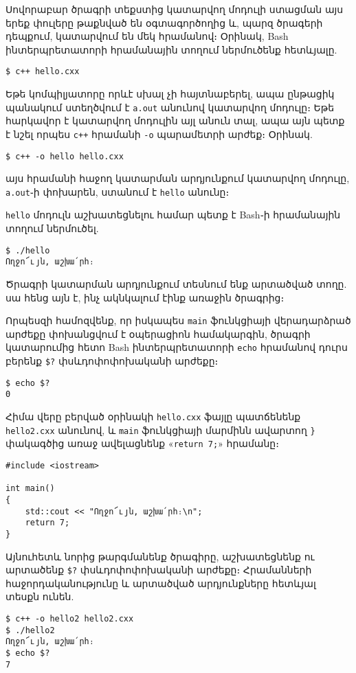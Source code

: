 Սովորաբար ծրագրի տեքստից կատարվող մոդուլի ստացման այս երեք փուլերը 
թաքնված են օգտագործողից և, պարզ ծրագերի դեպքում, կատարվում են մեկ 
հրամանով։ Օրինակ, Bash ինտերպրետատորի հրամանային տողում ներմուծենք 
հետևյալը.

\begin{Verbatim}
$ c++ hello.cxx
\end{Verbatim}

Եթե կոմպիլյատորը որևէ սխալ չի հայտնաբերել, ապա ընթացիկ պանակում ստեղծվում 
է \texttt{a.out} անունով կատարվող մոդուլը։ Եթե հարկավոր է կատարվող մոդուլին 
այլ անուն տալ, ապա այն պետք է նշել որպես \texttt{c++} հրամանի \texttt{-o} 
պարամետրի արժեք։ Օրինակ.

\begin{Verbatim}
$ c++ -o hello hello.cxx
\end{Verbatim}

\noindent այս հրամանի հաջող կատարման արդյունքում կատարվող մոդուլը, 
\texttt{a.out}֊ի փոխարեն, ստանում է \texttt{hello} անունը։

\texttt{hello} մոդուլն աշխատեցնելու համար պետք է Bash֊ի հրամանային 
տողում ներմուծել.

\begin{Verbatim}
$ ./hello
Ողջո՜ւյն, աշխա՛րհ։
\end{Verbatim}

Ծրագրի կատարման արդյունքում տեսնում ենք արտածված տողը. սա հենց այն է, 
ինչ ակնկալում էինք առաջին ծրագրից։

Որպեսզի համոզվենք, որ իսկապես \texttt{main} ֆունկցիայի վերադարձրած արժեքը 
փոխանցվում է օպերացիոն համակարգին, ծրագրի կատարումից հետո Bash ինտերպրետատորի 
\texttt{echo} հրամանով դուրս բերենք \verb|$?| փսևդոփոփոխականի արժեքը։

\begin{Verbatim}
$ echo $?
0
\end{Verbatim}

Հիմա վերը բերված օրինակի \texttt{hello.cxx} ֆայլը պատճենենք 
\texttt{hello2.cxx} անունով, և \texttt{main} ֆունկցիայի մարմինն ավարտող 
\verb|}| փակագծից առաջ ավելացնենք «\texttt{return 7;}» հրամանը։

\begin{Verbatim}
#include <iostream>

int main()
{
    std::cout << "Ողջո՜ւյն, աշխա՛րհ։\n";
    return 7;
}
\end{Verbatim}

Այնուհետև նորից թարգմանենք ծրագիրը, աշխատեցնենք ու արտածենք \verb|$?|
փսևդոփոփոխականի արժեքը։ Հրամանների հաջորդականությունը և արտածված 
արդյունքները հետևյալ տեսքն ունեն.

\begin{Verbatim}
$ c++ -o hello2 hello2.cxx
$ ./hello2
Ողջո՜ւյն, աշխա՛րհ։
$ echo $?
7
\end{Verbatim}


